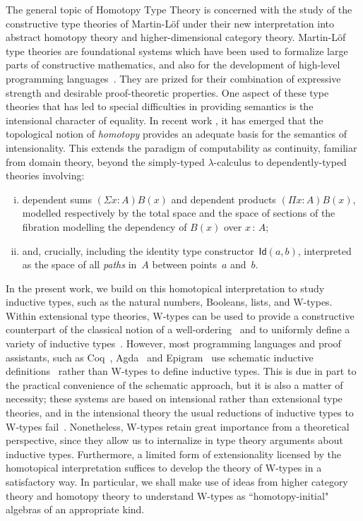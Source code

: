 \documentclass[10pt,a4paper,oneside,reqno]{amsart}
\theoremstyle{mythm}
\theoremstyle{mydef}
\theoremstyle{myrmk}
\newcommand{\co}{\,{:}\,}
\newcommand{\Id}{\mathsf{Id}}
\begin{document}
The general topic of Homotopy Type Theory is concerned with the study of the constructive type theories of Martin-L\"of under their new interpretation into abstract homotopy theory and higher-dimensional category theory. Martin-L\"of type theories are foundational systems which have been used to formalize large parts of constructive mathematics, and also for the development of high-level programming languages~\cite{MartinLofP:conmcp}.  They are prized for their combination of expressive strength and desirable proof-theoretic properties.  One aspect of these type theories that has led to special difficulties in providing semantics is the intensional character of equality.  In recent work \cite{AwodeyS:homtmi,VoevodskyV:notts,vandenBergB:topsmi,AwodeyS:typth}, it has emerged that the topological notion of \emph{homotopy} provides an adequate basis for the semantics of intensionality.  This extends the paradigm of computability as continuity, familiar from domain theory, beyond the simply-typed 
$\lambda$-calculus to dependently-typed theories involving:\begin{enumerate}[(i)]
\item dependent sums $(\Sigma x\colon\!{A})B(x)$ and dependent products $(\Pi x\colon\!{A})B(x)$, modelled respectively by the total space and the space of sections of the fibration modelling the dependency of $B(x)$ over $ x \co A$; \item
and, crucially, including the identity type constructor~$\Id(a,b)$, interpreted as the space of all \emph{paths} in~$A$ between points~$a$ and~$b$. \end{enumerate}

In the present work, we build on this homotopical interpretation to study inductive types, such as the natural numbers, Booleans, lists, and W-types. Within extensional type theories, W-types can be used to  provide a constructive counterpart of the classical notion of a well-ordering~\cite{MartinLofP:inttt} and to uniformly define a variety of inductive types~\cite{DybjerP:repids}.
However, most programming languages and proof assistants, such as Coq~\cite{BertotY:inttpp}, Agda~\cite{NorellU:towppl} and Epigram~\cite{McBrideC:viefl} use schematic inductive definitions~\cite{CoquandT:inddt,PaulinMorhringC:inddsc} rather than W-types to define inductive types.  This is due in part to the practical convenience of the schematic approach, but it is also a matter of necessity; these systems are based on intensional rather than extensional type theories, and in the intensional theory the usual reductions of inductive types to W-types fail~\cite{DybjerP:repids,McBrideC:wtygnb}.
Nonetheless, W-types retain great importance from a theoretical perspective, since they allow us to internalize in type theory arguments about inductive types. Furthermore, a limited form of extensionality licensed by the homotopical interpretation suffices to develop the theory of W-types in a satisfactory way. In particular, we shall make use of ideas from higher category theory and homotopy theory to understand W-types as ``homotopy-initial" algebras of an appropriate kind.
\end{document}
